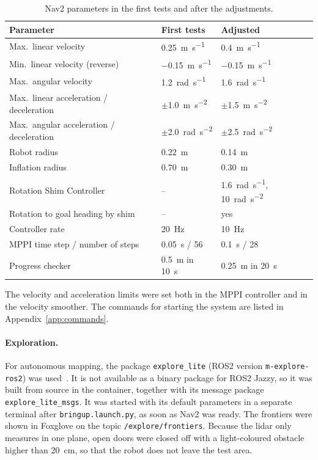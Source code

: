 \begin{table}[H]
  \centering
  \small
  \caption{Nav2 parameters in the first tests and after the adjustments.}
  \label{tab:nav2}
  \begin{tabular}{@{}lll@{}}
    \toprule
    \textbf{Parameter} & \textbf{First tests} & \textbf{Adjusted} \\
    \midrule
    Max.\ linear velocity & \SI{0.25}{\metre\per\second} & \SI{0.4}{\metre\per\second} \\
    Min.\ linear velocity (reverse) & \SI{-0.15}{\metre\per\second} & \SI{-0.15}{\metre\per\second} \\
    Max.\ angular velocity & \SI{1.2}{\radian\per\second} & \SI{1.6}{\radian\per\second} \\
    Max.\ linear acceleration / deceleration & $\pm$\SI{1.0}{\metre\per\second\squared} & $\pm$\SI{1.5}{\metre\per\second\squared} \\
    Max.\ angular acceleration / deceleration & $\pm$\SI{2.0}{\radian\per\second\squared} & $\pm$\SI{2.5}{\radian\per\second\squared} \\
    Robot radius & \SI{0.22}{\metre} & \SI{0.14}{\metre} \\
    Inflation radius & \SI{0.70}{\metre} & \SI{0.30}{\metre} \\
    Rotation Shim Controller & -- & \SI{1.6}{\radian\per\second}, \SI{10}{\radian\per\second\squared} \\
    Rotation to goal heading by shim & -- & yes \\
    Controller rate & \SI{20}{\hertz} & \SI{10}{\hertz} \\
    MPPI time step / number of steps & \SI{0.05}{\second} / 56 & \SI{0.1}{\second} / 28 \\
    Progress checker & \SI{0.5}{\metre} in \SI{10}{\second} & \SI{0.25}{\metre} in \SI{20}{\second} \\
    \bottomrule
  \end{tabular}
\end{table}

The velocity and acceleration limits were set both in the MPPI controller and in the velocity smoother. The commands for starting the system are listed in Appendix~\ref{app:commands}.

\paragraph{Exploration.} For autonomous mapping, the package \texttt{explore\_lite} (ROS2 version \texttt{m-explore-ros2}) was used~\citep{m_explore}. It is not available as a binary package for ROS2 Jazzy, so it was built from source in the container, together with its message package \texttt{explore\_lite\_msgs}. It was started with its default parameters in a separate terminal after \texttt{bringup.launch.py}, as soon as Nav2 was ready. The frontiers were shown in Foxglove on the topic \texttt{/explore/frontiers}. Because the lidar only measures in one plane, open doors were closed off with a light-coloured obstacle higher than \SI{20}{\centi\metre}, so that the robot does not leave the test area.

